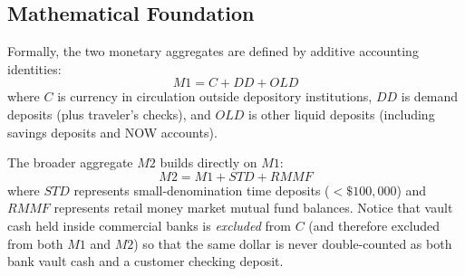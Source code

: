 \documentclass[11pt, oneside]{book}
\begin{document}
\subsection*{Mathematical Foundation}

Formally, the two monetary aggregates are defined by additive accounting identities:
\begin{equation}
  M1 = C + DD + OLD
  \label{eq:m1_def}
\end{equation}
where $C$ is currency in circulation outside depository institutions, $DD$ is demand deposits (plus traveler's checks), and $OLD$ is other liquid deposits (including savings deposits and NOW accounts).

The broader aggregate $M2$ builds directly on $M1$:
\begin{equation}
  M2 = M1 + STD + RMMF
  \label{eq:m2_def}
\end{equation}
where $STD$ represents small-denomination time deposits ($< \$100{,}000$) and $RMMF$ represents retail money market mutual fund balances. Notice that vault cash held inside commercial banks is \emph{excluded} from $C$ (and therefore excluded from both $M1$ and $M2$) so that the same dollar is never double-counted as both bank vault cash and a customer checking deposit.
\end{document}
